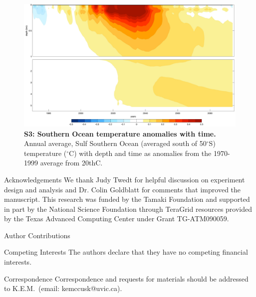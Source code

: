 \documentclass{nature}
\begin{document}
\begin{figure}%
\noindent\includegraphics[width=39pc]{figures/SuppFig3.pdf}  %
\caption{\textbf{S3: Southern Ocean temperature anomalies with time.} Annual average, Sulf Southern Ocean (averaged south of 50$^\circ$S) temperature ($^\circ$C) with depth and time as anomalies from the 1970-1999 average from 20thC.}
\label{fig:supp2}
\end{figure}







%




\begin{addendum}
\item[Acknowledgements] We thank Judy Twedt for helpful discussion on experiment design and analysis and Dr. Colin Goldblatt for comments that improved the manuscript. This research was funded by the Tamaki Foundation and supported in part by the National Science Foundation through TeraGrid resources provided by the Texas Advanced Computing Center under Grant TG-ATM090059.
\item[Author Contributions] 
 \item[Competing Interests] The authors declare that they have no competing financial interests.
\item[Correspondence] Correspondence and requests for materials should be addressed to K.E.M.~(email: kemccusk@uvic.ca).
\end{addendum}

\end{document}
